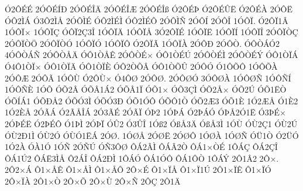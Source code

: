 {^^d32^^d4^^c9^^c9
2^^d3^^d4^^c9^^cd^^d0
2^^d3^^d4^^c9^^ce^^c4
2^^d3^^d4^^c9^^ce^^c6
2^^d3^^d4^^c9^^ce^^df
^^d32^^d4^^c9^^de
^^d32^^d4^^c9^^db^^cb
^^d32^^d4^^c9^^c0
2^^d3^^d4^^cb
^^d3^^d42^^cc^^c1
^^d33^^d42^^cc^^c5
2^^d3^^d4^^cc^^c9
^^d3^^d42^^cc^^c9^^cc
^^d3^^d42^^cc^^c9^^d4
2^^d3^^d4^^cc^^d1
2^^d3^^d4^^cd
2^^d3^^d4^^ce
1^^d3^^d4^^cf.
^^d32^^d4^^cf1^^c2
1^^d3^^d4^^cf^^d7
1^^d3^^d4^^cf^^c7
^^d3^^d4^^cf2^^c73^^ce
1^^d3^^d4^^cf^^c4
1^^d3^^d4^^cf^^c5
3^^d32^^d4^^cf^^c9
1^^d3^^d4^^cf^^cb
1^^d3^^d4^^cf^^cd
1^^d3^^d4^^cf^^ce
2^^d3^^d4^^cf^^d2^^c7
2^^d3^^d4^^cf^^d2^^d6
2^^d3^^d4^^cf^^d2^^d3
1^^d3^^d4^^cf^^d3
1^^d3^^d4^^cf^^d4
^^d32^^d4^^cf^^c3
1^^d3^^d4^^cf^^c0
2^^d3^^d4^^d0
2^^d3^^d4^^d2.
^^d3^^d4^^d2^^c1^^d32
4^^d3^^d4^^d2^^c1^^d1
2^^d3^^d4^^d2^^c5^^c4
^^d3^^d41^^d2^^c5^^ca
2^^d3^^d4^^d2^^c9^^d7
^^d3^^d41^^d2^^c9^^da
2^^d3^^d4^^d2^^c9^^cc
2^^d3^^d4^^d2^^c9^^dd
^^d3^^d41^^d2^^cf^^c1
^^d34^^d41^^d2^^cf^^d7
^^d3^^d41^^d2^^cf^^c4
^^d3^^d41^^d2^^cf^^c8
^^d3^^d42^^d2^^d5^^c2
^^d3^^d41^^d2^^d5^^db
2^^d3^^d4^^d3
^^d31^^d4^^d5^^d4
1^^d3^^d4^^d5^^c0
2^^d3^^d4^^c6
2^^d3^^d4^^c3
1^^d3^^d4^^d9
^^d32^^d4^^d9^^d7
^^d34^^d4^^d8
2^^d3^^d4^^d8.
2^^d3^^d4^^d8^^d3
3^^d3^^d4^^d8^^c0
1^^d3^^d4^^d8^^d1
1^^d3^^d4^^d1^^cd
1^^d3^^d4^^d1^^c8
1^^d3^^d5
^^d3^^d52^^c2
^^d3^^d5^^c21^^c12
^^d3^^d5^^c21^^cf
^^d3^^d51^^d7
^^d3^^d53^^c7^^cc
^^d3^^d52^^c5^^d7
^^d3^^d52^^da
^^d3^^d51^^cb^^d2
^^d3^^d5^^cd^^c11
^^d3^^d5^^d0^^c52
^^d3^^d5^^d33^^cc
^^d3^^d5^^d33^^d0
^^d3^^d51^^d3^^d4
^^d3^^d5^^d41^^d2
^^d3^^d52^^c63
^^d3^^d51^^c8
1^^d32^^c6^^c5
^^d31^^c82
1^^d32^^c8^^c5
2^^d3^^c3^^c1
^^d32^^c3^^c5^^ce^^c1
2^^d33^^c3^^c9
2^^d3^^c3^^cf
^^d3^^de2
1^^d3^^de^^c1
^^d32^^de^^c1^^d3
^^d3^^de^^c52^^d31^^cb
^^d33^^de^^c9^^d7
2^^d3^^de^^c9^^cb
^^d32^^de^^c9^^d4
^^d31^^de^^cc
2^^d3^^de^^cf
^^d3^^db2
^^d33^^db^^ce
1^^d3^^df2
^^d3^^df^^c53^^c4
^^d3^^df^^c53^^cc
1^^d3^^d9
^^d3^^d92^^c71
^^d3^^d92^^da
^^d3^^d92^^d01^^cc
^^d3^^d92^^d3
^^d3^^d9^^d31^^cb^^c1
2^^d3^^d8.
1^^d3^^d8^^c5
2^^d3^^d8^^cb
2^^d3^^d8^^d4
1^^d3^^d8^^c0
1^^d3^^d8^^d1
^^d3^^dc1^^d2
^^d32^^dc^^d3
1^^d32^^c0
^^d3^^c01^^d3
1^^d3^^d1
2^^d3^^d1^^da
^^d3^^d13^^d4^^d8
^^d4^^c12^^c2^^cc
^^d4^^c1^^c22^^d2
^^d4^^c11^^d7^^d2^^c9
1^^d4^^c1^^c7
^^d4^^c12^^c7^^ce
^^d4^^c11^^da2
^^d4^^c1^^cb3^^cc^^c5
^^d42^^c1^^ce
^^d4^^c12^^d0^^cc
1^^d4^^c1^^d3
^^d4^^c11^^d3^^d4
^^d4^^c11^^d4^^d2
1^^d4^^c1^^dd
2^^d41^^c22
2^^d4^^d7.
2^^d42^^d7^^c1
^^d41^^d7^^c5^^ca
^^d41^^d7^^c5^^cc
^^d41^^d7^^c5^^d4
2^^d4^^d7^^c9
^^d41^^d7^^cf^^c5
^^d41^^d7^^cf1^^da
2^^d41^^d7^^cf^^ca
^^d41^^d7^^cf^^d3
2^^d4^^d7^^cf^^c0
2^^d41^^d7^^d2
2^^d4^^d7^^d5
2^^d4^^d7^^d9
2^^d4^^d7^^d1
2^^d4^^c7
2^^d41^^c4
}
